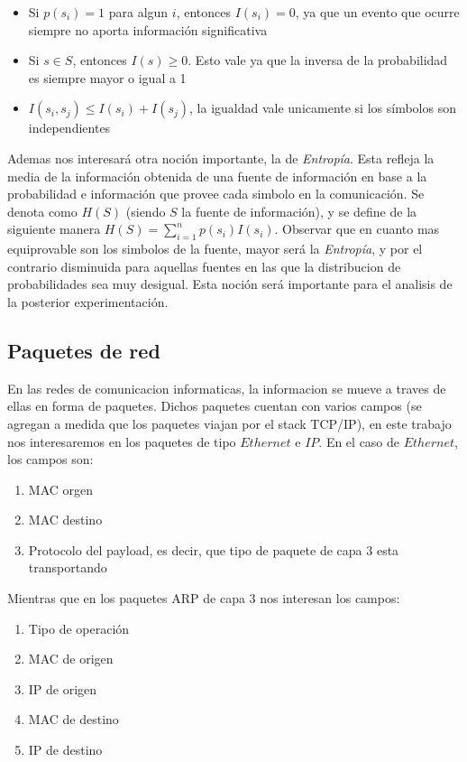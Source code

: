 \begin{itemize}
	\item Si $p(s_i) = 1$ para algun $i$, entonces $I(s_i) = 0$, ya que un evento que ocurre siempre no aporta información significativa
	\item Si $s \in S$, entonces $I(s) \geq 0$. Esto vale ya que la inversa de la probabilidad es siempre mayor o igual a 1
	\item $I(s_i, s_j) \leq I(s_i) + I(s_j)$, la igualdad vale unicamente si los símbolos son independientes
	
\end{itemize}

Ademas nos interesará otra noción importante, la de \textit{Entropía}. Esta refleja la media de la información obtenida de una fuente de información en base a la probabilidad e información que provee cada simbolo en la comunicación. Se denota como $H(S)$ (siendo $S$ la fuente de información), y se define de la siguiente manera $H(S) = \sum\limits_{i=1}^n p(s_i)I(s_i)$. Observar que en cuanto mas equiprovable son los simbolos de la fuente, mayor será la \textit{Entropía}, y por el contrario disminuida para aquellas fuentes en las que la distribucion de probabilidades sea muy desigual. Esta noción será importante para el analisis de la posterior experimentación.

\subsection{Paquetes de red}

En las redes de comunicacion informaticas, la informacion se mueve a traves de ellas en forma de paquetes. Dichos paquetes cuentan con varios campos (se agregan a medida que los paquetes viajan por el stack TCP/IP), en este trabajo nos interesaremos en los paquetes de tipo $Ethernet$ e $IP$. En el caso de $Ethernet$, los campos son:

\begin{enumerate}
	\item MAC orgen
	\item MAC destino
	\item Protocolo del payload, es decir, que tipo de paquete de capa 3 esta transportando
\end{enumerate}

Mientras que en los paquetes ARP de capa 3 nos interesan los campos:

\begin{enumerate}
	\item Tipo de operación
	\item MAC de origen
	\item IP de origen
	\item MAC de destino
	\item IP de destino
\end{enumerate}
